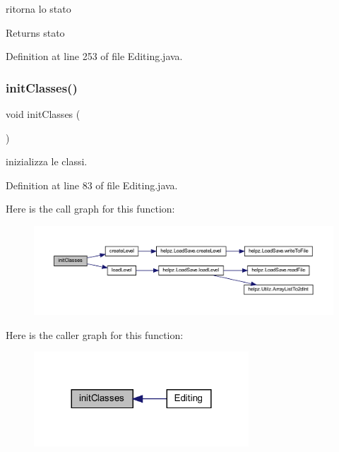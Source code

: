 ritorna lo stato 

\begin{DoxyReturn}{Returns}
stato 
\end{DoxyReturn}


Definition at line 253 of file Editing.\+java.

\mbox{\label{classscenes_1_1_editing_afe125d345675ffefe8da7e96d39773f3}} 
\subsubsection{\texorpdfstring{init\+Classes()}{initClasses()}}
{\footnotesize\ttfamily void init\+Classes (\begin{DoxyParamCaption}{ }\end{DoxyParamCaption})}



inizializza le classi. 



Definition at line 83 of file Editing.\+java.

Here is the call graph for this function\+:
\nopagebreak
\begin{figure}[H]
\begin{center}
\leavevmode
\includegraphics[width=350pt]{classscenes_1_1_editing_afe125d345675ffefe8da7e96d39773f3_cgraph}
\end{center}
\end{figure}
Here is the caller graph for this function\+:\nopagebreak
\begin{figure}[H]
\begin{center}
\leavevmode
\includegraphics[width=228pt]{classscenes_1_1_editing_afe125d345675ffefe8da7e96d39773f3_icgraph}
\end{center}
\end{figure}
\mbox{\label{classscenes_1_1_editing_a286931cc46e197f4a85af7229fdc29a4}} 
